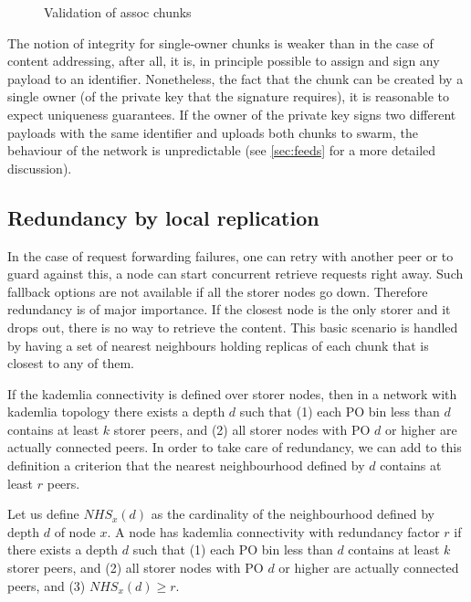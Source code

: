 \begin{figure}[htbp]
   \centering
   \caption{Validation of assoc chunks}
   \label{fig:assoc-integrity}
\end{figure}

The notion of integrity for single-owner chunks is weaker than in the case of content addressing, after all, it is, in principle possible to assign and sign any payload to an identifier. Nonetheless, the fact that the chunk can be created by a single owner (of the private key that the signature requires), it is reasonable to expect uniqueness guarantees. If the owner of the private key signs  two different payloads with the same identifier and uploads both chunks to swarm, the behaviour of the network is unpredictable (see \ref{sec:feeds} for a  more detailed discussion).


\subsection{Redundancy by local replication}\label{sec:redundancy-by-local-replication}

In the case of request forwarding failures, one can retry with another peer or to guard against this, a node can start concurrent retrieve requests right away. Such fallback options are not available if all the storer nodes go down. Therefore redundancy is of major importance. If the closest node is the only storer and it drops out, there is no way to retrieve the content. This basic scenario is handled by having a set of nearest neighbours holding replicas of each chunk that is closest to any of them. 

If the kademlia connectivity is defined over storer nodes, then in a network with kademlia topology there exists a depth $d$ such  that  (1) each PO bin less than $d$ contains at least $k$ storer peers, and (2) all storer nodes with PO $d$ or higher are actually connected peers. In order to take care of redundancy, we can add  to this definition a criterion that the nearest neighbourhood defined by $d$ contains at least $r$ peers.

Let us define $\mathit{NHS}_x(d)$ as the cardinality of the neighbourhood defined by depth $d$ of node $x$. 
A  node has kademlia connectivity with redundancy factor $r$ if there exists a depth $d$ such  that  (1) each PO bin less than $d$ contains at least $k$ storer peers, and (2) all storer nodes with PO $d$ or higher are actually connected peers, and (3) $\mathit{NHS}_x(d)\geq r$.

